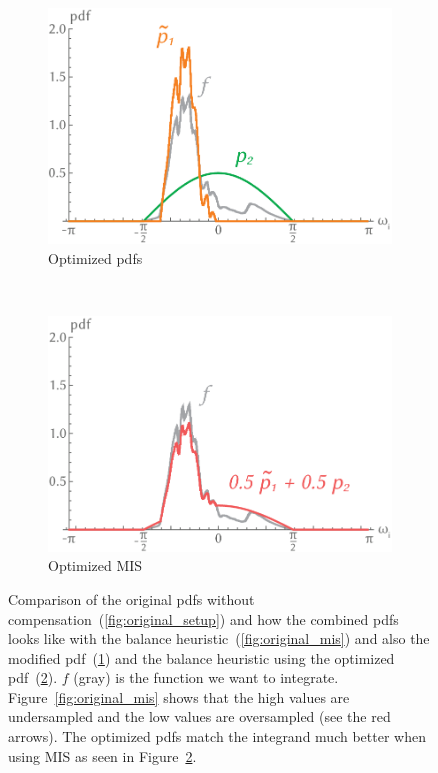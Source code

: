 \begin{figure}[h]
\begin{subfigure}[b]{.3\textwidth}
        \includegraphics[width=\textwidth]{images/optimized_setup.png}
        \caption{Optimized pdfs
        \label{fig:optimized_setup}}
    \end{subfigure}
    ~
    \begin{subfigure}[b]{.3\textwidth}
        \centering
        \includegraphics[width=\textwidth]{images/mis_optimized.png}
        \caption{Optimized MIS}
        \label{fig:optimized_mis}
    \end{subfigure}
    \caption{Comparison of the original pdfs without compensation~(\ref{fig:original_setup})
    and how the combined pdfs looks like with the balance heuristic~(\ref{fig:original_mis})
    and also the modified pdf~(\ref{fig:optimized_setup}) and the balance heuristic using the optimized pdf~(\ref{fig:optimized_mis}).
    $ f $ (gray) is the function we want to integrate.
    Figure~\ref{fig:original_mis} shows that the high values are undersampled and the low values are oversampled (see the red arrows).
    The optimized pdfs match the integrand much better when using MIS as seen in Figure~\ref{fig:optimized_mis}.
    \cite[Figure~2]{Karlik2019}}
    \label{fig:pdf_comparison}
\end{figure}

